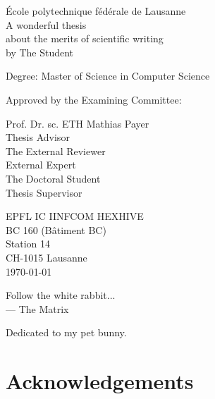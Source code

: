 \documentclass[a4paper,11pt,oneside]{report}
\author{}
\newlength{\drop}
\newlength{\tpheight}\setlength{\tpheight}{0.9\textheight}
\newlength{\txtheight}\setlength{\txtheight}{0.9\tpheight}
\newcommand{\thesistitle}{A wonderful thesis\\about the merits of scientific writing}
\newcommand{\thesisauthor}{The Student}
\newcommand{\thesisadviser}{The Doctoral Student}
\newcommand{\thesissupervisor}{Prof. Dr. sc. ETH Mathias Payer}
\newcommand{\thesisexpert}{The External Reviewer}
\newcommand{\thesistype}{Master of Science in Computer Science}
\begin{document}
\setlength{\parindent}{0pt}
\setlength{\parskip}{0pt}

\begin{titlepage}
\begingroup
{}\txtheight
\vspace*{\drop}
\centering 
{\LARGE École polytechnique fédérale de Lausanne}\\[2\baselineskip]
{\LARGE\sffamily \thesistitle{}}\\[2\baselineskip]
by \thesisauthor\par
\vfill
{\LARGE Degree: \thesistype}\par
\vspace{\drop}


\flushleft
{Approved by the Examining Committee:}\par
\vspace{1.5\baselineskip}
\thesissupervisor\\
Thesis Advisor \\[1\baselineskip]
\thesisexpert\\
External Expert \\[1\baselineskip]
\thesisadviser\\
Thesis Supervisor\par
\centering
\vspace{1\baselineskip}
EPFL IC IINFCOM HEXHIVE \\
BC 160 (Bâtiment BC) \\
Station 14 \\
CH-1015 Lausanne \\[\baselineskip]
\today
\par
\vfill
\endgroup
\end{titlepage}

\cleardoublepage
\thispagestyle{empty}
\vspace*{3cm}

\begin{raggedleft}
    Follow the white rabbit...\\
    --- The Matrix\\
\end{raggedleft}
\vspace{4cm}
\begin{center}
    Dedicated to my pet bunny.
\end{center}
\setcounter{page}{0}

\cleardoublepage
\chapter*{Acknowledgements}
\lipsum[1-2]
\end{document}
